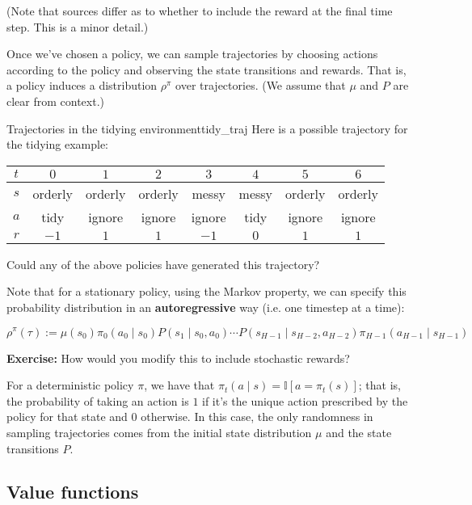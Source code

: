 \documentclass[../main/main]{subfiles}
\begin{document}
(Note that sources differ as to whether to include the reward at the final time step. This is a minor detail.)

Once we've chosen a policy, we can sample trajectories by choosing actions according to the policy and observing the state transitions and rewards. That is, a policy induces a distribution $\rho^{\pi}$ over trajectories. (We assume that $\mu$ and $P$ are clear from context.)

\begin{example}{Trajectories in the tidying environment}{tidy_traj}
    Here is a possible trajectory for the tidying example:

    \begin{center}
    \begin{tabular}{cccccccc}
        $t$ & $0$ & $1$ & $2$ & $3$ & $4$ & $5$ & $6$ \\
        \hline
        $s$ & orderly & orderly & orderly & messy & messy & orderly & orderly \\
        $a$ & tidy & ignore & ignore & ignore & tidy & ignore & ignore \\
        $r$ & $-1$ & $1$ & $1$ & $-1$ & $0$ & $1$ & $1$
    \end{tabular}
    \end{center}

    Could any of the above policies have generated this trajectory?
\end{example}

Note that for a stationary policy, using the Markov property, we can specify this probability distribution in an \textbf{autoregressive} way (i.e. one timestep at a time):

\[
    \rho^{\pi}(\tau) := \mu(s_0) \pi_0(a_0 \mid s_0) P(s_1 \mid s_0, a_0) \cdots P(s_{H-1} \mid s_{H-2}, a_{H-2}) \pi_{H-1}(a_{H-1} \mid s_{H-1})
\]

\textbf{Exercise:} How would you modify this to include stochastic rewards?

For a deterministic policy $\pi$, we have that $\pi_t(a \mid s) = \mathbb{I}[a = \pi_t(s)]$; that is, the probability of taking an action is $1$ if it's the unique action prescribed by the policy for that state and $0$ otherwise. In this case, the only randomness in sampling trajectories comes from the initial state distribution $\mu$ and the state transitions $P$.

\subsection{Value functions}
\end{document}

